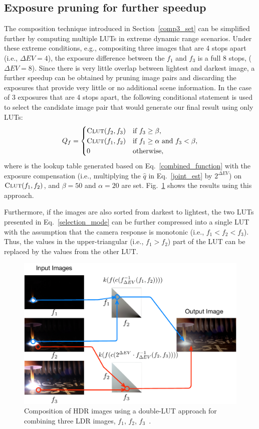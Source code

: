 \subsection{Exposure pruning for further speedup}
The composition technique introduced in Section~\ref{comp3_set} can be
simplified further by computing multiple LUTs in extreme dynamic range
scenarios.  Under these extreme conditions, e.g., compositing three
images that are 4 stops apart (i.e., $\Delta EV=4$), the exposure
difference between the $f_1$ and $f_3$ is a full 8 stops, ($\Delta
EV=8$).  Since there is very little overlap between lightest and
darkest image, a further speedup can be obtained
by pruning image pairs and discarding the exposures that provide very little or no additional
scene information.  In the case of 3 exposures that are 4 stops apart,
the following conditional statement is used to select the
candidate image pair that would generate our final result using only
LUTs:
\begin{equation}\label{selection_mode}
  Q_f=
  \begin{cases}
    \mbox{\textsc{Clut}}(f_2,f_3) & \text{if $f_3 \ge \beta$},         \\
    \mbox{\textsc{Clut}}(f_1,f_2) & \text{if $f_1 \ge \alpha$ and $f_3 < \beta$} ,	\\
    0 &\text{otherwise},
  \end{cases}
\end{equation}
where \CLUT{} is the lookup table generated based on
Eq.~\ref{combined_function} with the exposure compensation (i.e.,
multiplying the $\hat{q}$ in Eq.~\ref{joint_est} by $2^{\Delta EV}$)
on $\mbox{\textsc{Clut}}(f_1, f_2)$, and $\beta=50$ and $\alpha=20$ are set. Fig.~\ref{3_direct_lut} shows the 
results using this approach.

Furthermore, if the images are also sorted from darkest
to lightest, the two LUTs presented in Eq.~\ref{selection_mode} can be
further compressed into a single LUT with the assumption that the
camera response is monotonic (i.e., $f_1<f_2<f_3$).  Thus, the values
in the upper-triangular (i.e., $f_1>f_2$) part of the LUT can be
replaced by the values from the other LUT.
\begin{figure}
\center
  \includegraphics[width=13cm]{ch3/diagrams/3_direct_lut.pdf}
  \caption{Composition of HDR images using a double-LUT approach for
    combining three LDR images, $f_1$, $f_2$, $f_3$~\cite{mann2012realtime}.  }
  \label{3_direct_lut}
\end{figure}

